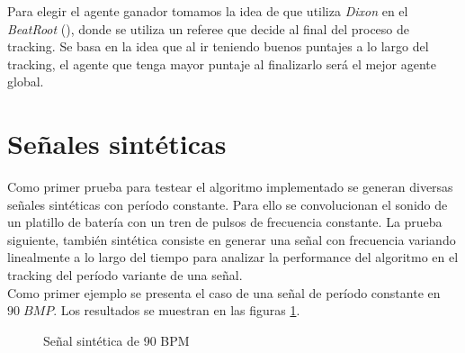 \documentclass[12pt,a4paper,titlepage]{report}
\begin{document}
Para elegir el agente ganador tomamos la idea de que utiliza \emph{Dixon} en el \emph{BeatRoot} (\cite{bib:dixon}), donde se utiliza un referee que decide al final del proceso de tracking. Se basa en la idea que al ir teniendo buenos puntajes a lo largo del tracking, el agente que tenga mayor puntaje al finalizarlo será el mejor agente global.

\section{Señales sintéticas}

Como primer prueba para testear el algoritmo implementado se generan diversas señales sintéticas con período constante. Para ello se convolucionan el sonido de un platillo de batería con un tren de pulsos de frecuencia constante. La prueba siguiente, también sintética consiste en generar una señal con frecuencia variando linealmente a lo largo del tiempo para analizar la performance del algoritmo en el tracking del período variante de una señal.\\

Como primer ejemplo se presenta el caso de una señal de período constante en $90\;BMP$. Los resultados se muestran en las figuras \ref{fig:90BPM}.

\begin{figure} [h!]
\centering
  \caption{Señal sintética de 90 BPM}
  \label{fig:90BPM}
\end{figure}
\end{document}
